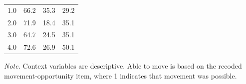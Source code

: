 \begin{table}[H]
\begin{tabular*}{\textwidth}{@{\extracolsep{\fill}}lccc@{}}
\midrule
1.0 & 66.2 & 35.3 & 29.2 \\
2.0 & 71.9 & 18.4 & 35.1 \\
3.0 & 64.7 & 24.5 & 35.1 \\
4.0 & 72.6 & 26.9 & 50.1 \\
\bottomrule
\end{tabular*}
\par\vspace{3pt}\noindent\parbox{\textwidth}{\footnotesize\textit{Note.} Context variables are descriptive. Able to move is based on the recoded movement-opportunity item, where 1 indicates that movement was possible.}
\endgroup
\end{table}
